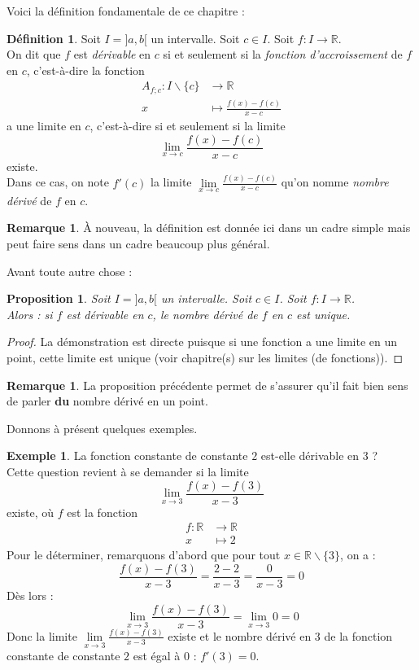 \documentclass[a4paper,fontsize=13pt]{scrreprt}
\theoremstyle{plain}
\newtheorem{pro}[subsection]{Proposition}
\theoremstyle{definition}
\newtheorem{déf}[subsection]{Définition}
\newtheorem{exe}[subsection]{Exemple}
\newtheorem{rema}[subsection]{Remarque}
\newcommand{\rr}{\mathbb{R}}
\begin{document}
Voici la définition fondamentale de ce chapitre :
\begin{déf}
	Soit $I = ]a,b[$ un intervalle. Soit $c \in I$. Soit $f : I \to \rr$. \\On dit que $f$ est \emph{dérivable} en $c$ si et seulement si la \emph{fonction d'accroissement} de $f$ en $c$, c'est-à-dire la fonction
	\begin{align*}
	A_{f;c} : I \backslash \{c\} &\to \rr \\
	x &\mapsto \frac{f(x)-f(c)}{x-c}
	\end{align*}
	a une limite en $c$, c'est-à-dire si et seulement si la limite
	$$\lim\limits_{x\to c} \frac{f(x)-f(c)}{x-c}$$
	existe. \\
	Dans ce cas, on note $f'(c)$ la limite $\lim\limits_{x\to c} \frac{f(x)-f(c)}{x-c}$ qu'on nomme \emph{nombre dérivé} de $f$ en $c$.
\end{déf}
\begin{rema}
	À nouveau, la définition est donnée ici dans un cadre simple mais peut faire sens dans un cadre beaucoup plus général.
\end{rema}
Avant toute autre chose :
\begin{pro}
	Soit $I = ]a,b[$ un intervalle. Soit $c \in I$. Soit $f : I \to \rr$. \\
	Alors : si $f$ est dérivable en $c$, le nombre dérivé de $f$ en $c$ est unique.
\end{pro}
\begin{proof}
	La démonstration est directe puisque si une fonction a une limite en un point, cette limite est unique (voir chapitre(s) sur les limites (de fonctions)).
\end{proof}
\begin{rema}
	La proposition précédente permet de s'assurer qu'il fait bien sens de parler \textbf{du} nombre dérivé en un point.
\end{rema}
Donnons à présent quelques exemples.
\begin{exe}
	La fonction constante de constante $2$ est-elle dérivable en $3$ ? \\
	Cette question revient à se demander si la limite
	$$\lim\limits_{x\to 3} \frac{f(x)-f(3)}{x-3}$$
	existe, où $f$ est la fonction
	\begin{align*}
	f : \rr &\to \rr \\
	x &\mapsto 2
	\end{align*}
	Pour le déterminer, remarquons d'abord que pour tout $x \in \rr \backslash \{3\}$, on a :
	$$\frac{f(x)-f(3)}{x-3} = \frac{2-2}{x-3} = \frac{0}{x-3} = 0$$
	Dès lors :
	$$\lim\limits_{x\to 3} \frac{f(x)-f(3)}{x-3} = \lim\limits_{x\to 3} 0=0$$
	Donc la limite $\lim\limits_{x\to 3} \frac{f(x)-f(3)}{x-3}$ existe et le nombre dérivé en $3$ de la fonction constante de constante $2$ est égal à $0$ : $f'(3)=0$.
\end{exe}
\end{document}
